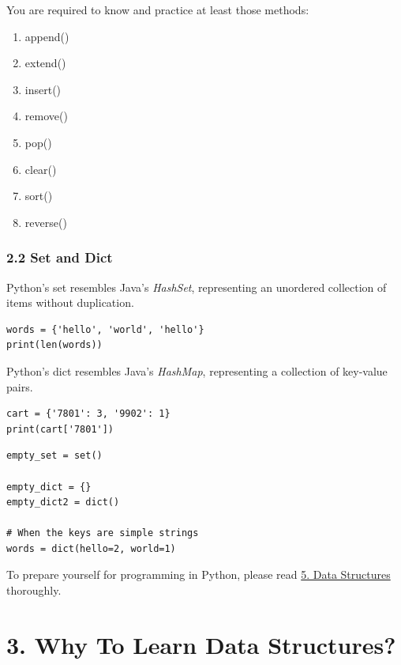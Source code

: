 \documentclass[aspectratio=169, 14pt]{beamer}
\begin{document}
\begin{frame}
You are required to know and practice at least those methods:
\begin{enumerate}
    \item append()
    \item extend()
    \item insert()
    \item remove()
    \item pop()
    \item clear()
    \item sort()
    \item reverse()
\end{enumerate}    

\end{frame}

\begin{frame}[fragile]
    \frametitle{2.2 Set and Dict}
Python's \alert{set} resembles Java's \emph{HashSet}, representing an unordered collection of items without duplication.
\begin{verbatim}
words = {'hello', 'world', 'hello'}
print(len(words))    
\end{verbatim}
\pause
Python's \alert{dict} resembles Java's \emph{HashMap}, representing a collection of key-value pairs.
\begin{verbatim}
cart = {'7801': 3, '9902': 1}
print(cart['7801'])    
\end{verbatim}
\end{frame}

\begin{frame}[fragile]
    \begin{verbatim}
empty_set = set()

empty_dict = {}
empty_dict2 = dict()

# When the keys are simple strings
words = dict(hello=2, world=1)
    \end{verbatim}
    
\pause
{\large {}} To prepare yourself for programming in Python, please read \href{https://docs.python.org/3/tutorial/datastructures.html}{5. Data Structures} thoroughly.
\end{frame}


\section{\textcolor{darkmidnightblue}{3. Why To Learn Data Structures?}}
\end{document}
